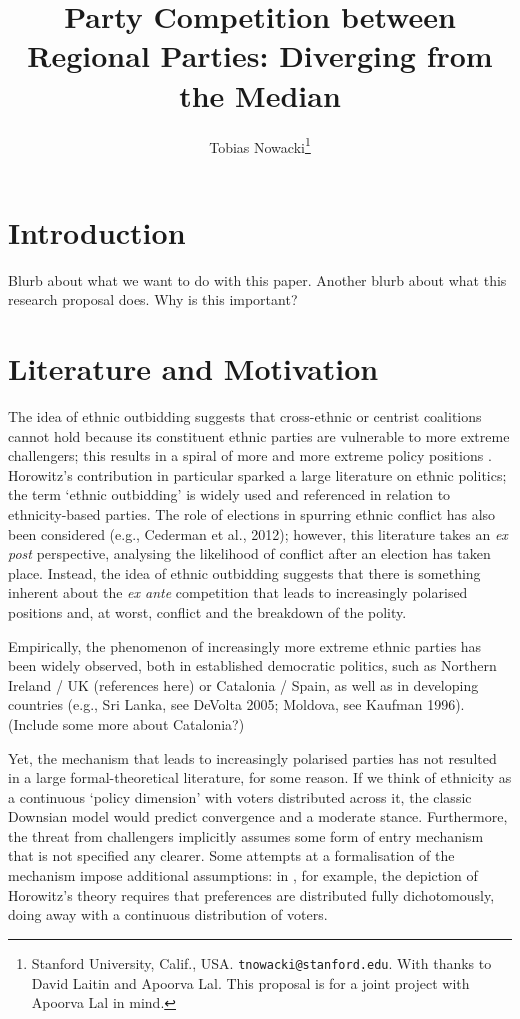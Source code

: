 \documentclass[11pt]{article}
\title{Party Competition between Regional Parties: Diverging from the Median}
\author{Tobias Nowacki\thanks{Stanford University, Calif., USA. \texttt{tnowacki@stanford.edu}. With thanks to David Laitin and Apoorva Lal. This proposal is for a joint project with Apoorva Lal in mind.}}
\begin{document}
\maketitle

\onehalfspacing

\section{Introduction}

Blurb about what we want to do with this paper.
Another blurb about what this research proposal does.
Why is this important?

\section{Literature and Motivation}

The idea of ethnic outbidding suggests that cross-ethnic or centrist coalitions cannot hold because its constituent ethnic parties are vulnerable to more extreme challengers; this results in a spiral of more and more extreme policy positions \parencite{Horowitz2000, Rabushka1972, Chandra2005}. Horowitz's contribution in particular sparked a large literature on ethnic politics; the term `ethnic outbidding' is widely used and referenced in relation to ethnicity-based parties. The role of elections in spurring ethnic conflict has also been considered (e.g., Cederman et al., 2012); however, this literature takes an \textit{ex post} perspective, analysing the likelihood of conflict after an election has taken place. Instead, the idea of ethnic outbidding suggests that there is something inherent about the \textit{ex ante} competition that leads to increasingly polarised positions and, at worst, conflict and the breakdown of the polity.

Empirically, the phenomenon of increasingly more extreme ethnic parties has been widely observed, both in established democratic politics, such as Northern Ireland / UK (references here) or Catalonia / Spain, as well as in developing countries (e.g., Sri Lanka, see DeVolta 2005; Moldova, see Kaufman 1996). (Include some more about Catalonia?)

Yet, the mechanism that leads to increasingly polarised parties has not resulted in a large formal-theoretical literature, for some reason. If we think of ethnicity as a continuous `policy dimension' with voters distributed across it, the classic Downsian model would predict convergence and a moderate stance. Furthermore, the threat from challengers implicitly assumes some form of entry mechanism that is not specified any clearer. Some attempts at a formalisation of the mechanism impose additional assumptions: in \textcite{Chandra2005}, for example, the depiction of Horowitz's theory requires that preferences are distributed fully dichotomously, doing away with a continuous distribution of voters.
\end{document}
